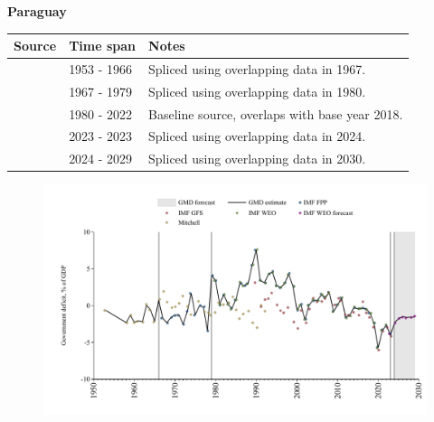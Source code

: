 \documentclass[12pt,a4paper,landscape]{article}
\begin{document}
\begin{adjustbox}{max totalsize={\paperwidth}{\paperheight},center}
\begin{minipage}[t][\textheight][t]{\textwidth}
\vspace*{0.5cm}
{}
\begin{center}
{\Large\bfseries Paraguay}
\end{center}
\vspace{0.5cm}
\begin{table}[H]
\centering
\small
\begin{tabular}{|l|l|l|}
\hline
\textbf{Source} & \textbf{Time span} & \textbf{Notes} \\
\hline
\rowcolor{white}\cite{Mitchell}& 1953 - 1966 &Spliced using overlapping data in 1967.\\
\rowcolor{lightgray}\cite{IMF_FPP}& 1967 - 1979 &Spliced using overlapping data in 1980.\\
\rowcolor{white}\cite{IMF_WEO}& 1980 - 2022 &Baseline source, overlaps with base year 2018.\\
\rowcolor{lightgray}\cite{IMF_GFS}& 2023 - 2023 &Spliced using overlapping data in 2024.\\
\rowcolor{white}\cite{IMF_WEO_forecast}& 2024 - 2029 &Spliced using overlapping data in 2030.\\
\hline
\end{tabular}
\end{table}
\begin{figure}[H]
\centering
\includegraphics[width=\textwidth,height=0.6\textheight,keepaspectratio]{graphs/PRY_govdef_GDP.pdf}
\end{figure}
\end{minipage}
\end{adjustbox}
\end{document}
